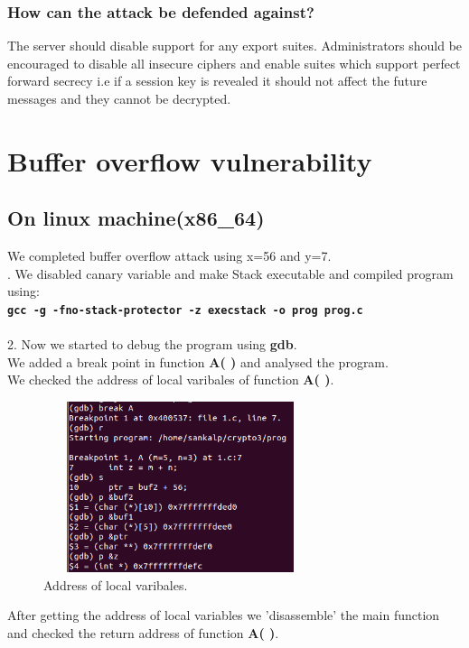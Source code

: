 \documentclass{article}
\begin{document}
\subsubsection{How can the attack be defended against?}
\indent \indent The server should disable support for any export suites. Administrators should be encouraged to disable all insecure ciphers and enable suites which support perfect forward secrecy i.e if a session key is revealed it should not affect the future messages and they cannot be decrypted.

\section{Buffer overflow vulnerability}
  \subsection{On linux machine(x86\_64)}
  We completed buffer overflow attack using  x=56 and y=7.\\
        
  . We disabled canary variable and make Stack executable and compiled program using:\\
  \textbf{\tt gcc -g -fno-stack-protector -z execstack -o prog prog.c}\\\\
  2. Now we started to debug the program using \textbf{gdb}.\\
    We added a break point in function \textbf{A( )} and analysed the program.\\
    We checked the address of local varibales of function \textbf{A( )}.\\
  
  \begin{figure}[htb]
   \begin{center}
		\includegraphics[width=8cm,height=5cm]{bo.png}
	\caption{Address of local varibales.}
	 \end{center}
	\end{figure}
      After getting the address of local variables we 'disassemble' the main function
      and checked the return address of function \textbf{A( )}.\\
      
\end{document}
